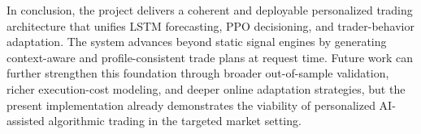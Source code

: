 In conclusion, the project delivers a coherent and deployable personalized trading architecture that unifies LSTM forecasting, PPO decisioning, and trader-behavior adaptation. The system advances beyond static signal engines by generating context-aware and profile-consistent trade plans at request time. Future work can further strengthen this foundation through broader out-of-sample validation, richer execution-cost modeling, and deeper online adaptation strategies, but the present implementation already demonstrates the viability of personalized AI-assisted algorithmic trading in the targeted market setting.
